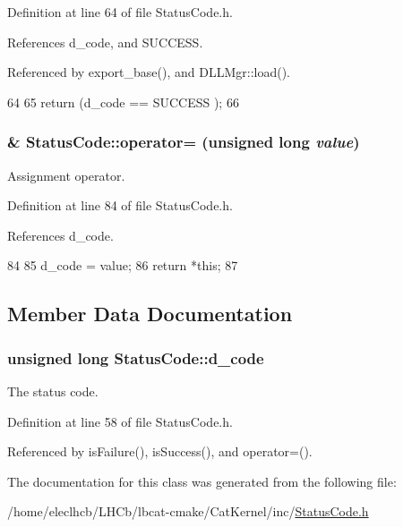 Definition at line 64 of file StatusCode.h.

References d\_\-code, and SUCCESS.

Referenced by export\_\-base(), and DLLMgr::load().


\begin{DoxyCode}
64                                         {
65   return (d_code == SUCCESS );
66 }
\end{DoxyCode}
\hypertarget{classStatusCode_af5179c5605558840cefe14e2794265de}{
\subsubsection[{operator=}]{ \& StatusCode::operator= (unsigned long {\em value})}}
\label{classStatusCode_af5179c5605558840cefe14e2794265de}


Assignment operator. 

Definition at line 84 of file StatusCode.h.

References d\_\-code.


\begin{DoxyCode}
84                                                               {
85   d_code = value;
86   return *this;
87 }
\end{DoxyCode}


\subsection{Member Data Documentation}
\hypertarget{classStatusCode_aff37ebcb323b897044b42d303cf72d93}{
\subsubsection[{d\_\-code}]{\setlength{\rightskip}{0pt plus 5cm}unsigned long {\bf StatusCode::d\_\-code}}}
\label{classStatusCode_aff37ebcb323b897044b42d303cf72d93}


The status code. 

Definition at line 58 of file StatusCode.h.

Referenced by isFailure(), isSuccess(), and operator=().

The documentation for this class was generated from the following file:\begin{DoxyCompactItemize}
\item 
/home/eleclhcb/LHCb/lbcat-\/cmake/CatKernel/inc/\hyperlink{StatusCode_8h}{StatusCode.h}\end{DoxyCompactItemize}
